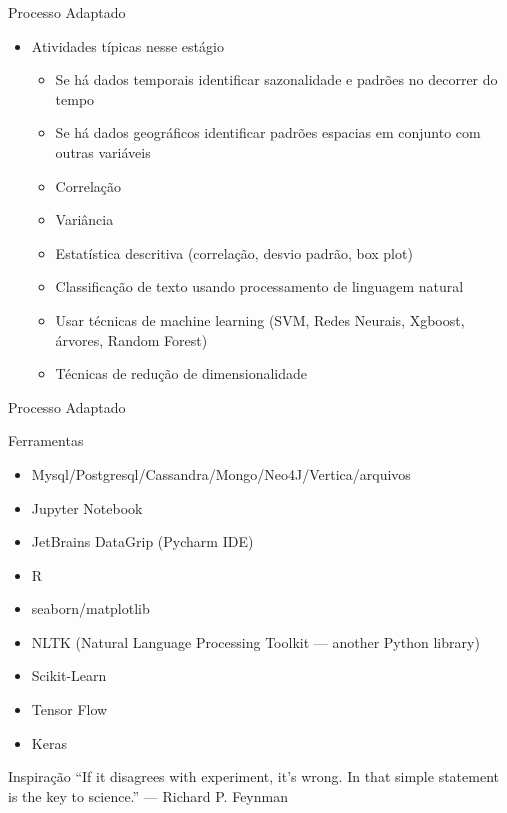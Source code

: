 \begin{frame}
	\begin{block}{Processo Adaptado}
		\begin{itemize}
		\item Atividades típicas nesse estágio
				\begin{itemize}
					\item Se há dados temporais identificar sazonalidade e padrões no decorrer do tempo
					\item Se há dados geográficos identificar padrões espacias em conjunto com outras variáveis
					\item Correlação
					\item Variância
					\item Estatística descritiva (correlação, desvio padrão, box plot)
					\item Classificação de texto usando processamento de linguagem natural
					\item  Usar técnicas de machine learning (SVM, Redes Neurais, Xgboost, árvores, Random Forest)
					\item Técnicas de redução de dimensionalidade
				\end{itemize}
		\end{itemize}				
	\end{block}
\end{frame}
    

\begin{frame}
	\begin{block}{Processo Adaptado}
	
		Ferramentas
		\begin{itemize}
			\item Mysql/Postgresql/Cassandra/Mongo/Neo4J/Vertica/arquivos
			\item Jupyter Notebook
			\item JetBrains DataGrip (Pycharm IDE)
			\item R
			\item seaborn/matplotlib
			\item NLTK (Natural Language Processing Toolkit — another Python library)
			\item Scikit-Learn
			\item Tensor Flow
			\item Keras
		\end{itemize}
	\end{block}
\end{frame}

\begin{frame}
	\begin{block}{Inspiração}
		``If it disagrees with experiment, it’s wrong. In that simple statement is the key to science.'' — Richard P. Feynman
	\end{block}
\end{frame}




